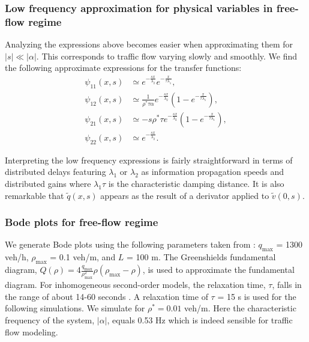 \documentclass[a4paper, 10pt, conference]{ieeeconf}      %
\begin{document}
\subsubsection{Low frequency approximation for physical variables in free-flow regime}
Analyzing the expressions above becomes easier when approximating them for $\left|s\right|\ll\left|\alpha\right|$. This corresponds to traffic flow varying slowly and smoothly. We find the following approximate expressions for the transfer functions:
\begin{subequations}
\begin{align}
\psi_{11}(x,s)
&\simeq
e^{-\frac{sx}{\lambda_{2}}}
e^{-\frac{x}{\tau\lambda_{1}}}
, \\
\psi_{12}(x,s)
&\simeq
\frac{
	1
}{
	\rho^{*}\tau\alpha
}
e^{-\frac{sx}{\lambda_{2}}}
\left(
	1 - e^{-\frac{x}{\tau\lambda_{1}}}
\right)
, \\
\psi_{21}(x,s)
& \simeq
- s \rho^{*} \tau
e^{-\frac{sx}{\lambda_{2}}}
\left(
	1 - e^{-\frac{x}{\tau\lambda_{1}}}
\right)
, \\
\psi_{22}(x,s)
&\simeq
e^{-\frac{sx}{\lambda_{2}}}
.
\end{align}
\end{subequations}

Interpreting the low frequency expressions is fairly straightforward in terms of distributed delays featuring $\lambda_1$ or $\lambda_2$ as information propagation speeds and distributed gains where $\lambda_1 \tau$ is the characteristic damping distance. It is also remarkable that $\widetilde{q}(x,s)$ appears as the result of a derivator applied to $\widetilde{v}(0,s)$.

\subsubsection{Bode plots for free-flow regime}

We generate Bode plots using the following parameters taken from \cite{Hofleitner}: $q_{\text{max}}$ = 1300 veh/h, $\rho_{\text{max}}$ = 0.1 veh/m, and $L$ = 100 m. The Greenshields fundamental diagram, $Q( \rho) = 4 \frac{q_{\text{max}}}{\rho_{\text{max}}^2}\rho (\rho_{\text{max}} - \rho)$, is used to approximate the fundamental diagram. For inhomogeneous second-order models, the relaxation time, $\tau$, falls in the range of about 14-60 seconds \cite{Fan}. A relaxation time of $\tau$ = 15 s is used for the following simulations. We simulate for $\rho^* = 0.01$ veh/m. Here the characteristic frequency of the system, $\left|\alpha\right|$, equals 0.53 Hz which is indeed sensible for traffic flow modeling.
\end{document}
